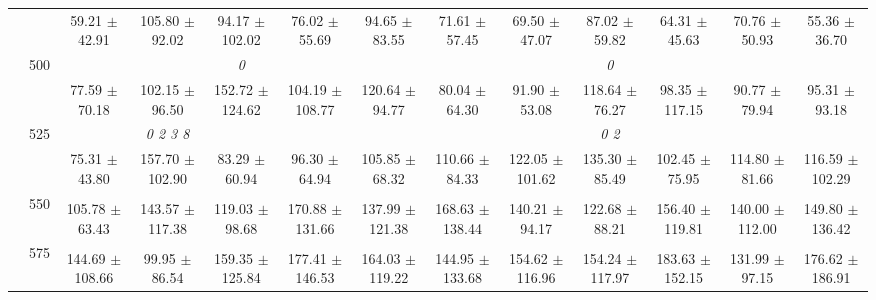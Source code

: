 \begin{table}[h]
{\begin{tabular}{
        ccccccccccccc}
 & & \cellcolor[HTML]{EFEFEF} 59.21 $\pm$ 42.91& \cellcolor[HTML]{EFEFEF} 105.80 $\pm$ 92.02& \cellcolor[HTML]{EFEFEF} 94.17 $\pm$ 102.02& \cellcolor[HTML]{EFEFEF} 76.02 $\pm$ 55.69& \cellcolor[HTML]{EFEFEF} 94.65 $\pm$ 83.55& \cellcolor[HTML]{EFEFEF} 71.61 $\pm$ 57.45& \cellcolor[HTML]{EFEFEF} 69.50 $\pm$ 47.07& \cellcolor[HTML]{EFEFEF} 87.02 $\pm$ 59.82& \cellcolor[HTML]{EFEFEF} 64.31 $\pm$ 45.63& \cellcolor[HTML]{EFEFEF} 70.76 $\pm$ 50.93& \cellcolor[HTML]{EFEFEF} 55.36 $\pm$ 36.70 \\ 
 & \multirow{2}{*}{500}& & & \textit{ 0 }& & & & & \textit{ 0 }& & &  \\ 
 & & 77.59 $\pm$ 70.18& 102.15 $\pm$ 96.50& 152.72 $\pm$ 124.62& 104.19 $\pm$ 108.77& 120.64 $\pm$ 94.77& 80.04 $\pm$ 64.30& 91.90 $\pm$ 53.08& 118.64 $\pm$ 76.27& 98.35 $\pm$ 117.15& 90.77 $\pm$ 79.94& 95.31 $\pm$ 93.18 \\ 
 & \multirow{2}{*}{525}& \cellcolor[HTML]{EFEFEF} & \cellcolor[HTML]{EFEFEF} \textit{ 0 2 3 8 }& \cellcolor[HTML]{EFEFEF} & \cellcolor[HTML]{EFEFEF} & \cellcolor[HTML]{EFEFEF} & \cellcolor[HTML]{EFEFEF} & \cellcolor[HTML]{EFEFEF} & \cellcolor[HTML]{EFEFEF} \textit{ 0 2 }& \cellcolor[HTML]{EFEFEF} & \cellcolor[HTML]{EFEFEF} & \cellcolor[HTML]{EFEFEF}  \\ 
 & & \cellcolor[HTML]{EFEFEF} 75.31 $\pm$ 43.80& \cellcolor[HTML]{EFEFEF} 157.70 $\pm$ 102.90& \cellcolor[HTML]{EFEFEF} 83.29 $\pm$ 60.94& \cellcolor[HTML]{EFEFEF} 96.30 $\pm$ 64.94& \cellcolor[HTML]{EFEFEF} 105.85 $\pm$ 68.32& \cellcolor[HTML]{EFEFEF} 110.66 $\pm$ 84.33& \cellcolor[HTML]{EFEFEF} 122.05 $\pm$ 101.62& \cellcolor[HTML]{EFEFEF} 135.30 $\pm$ 85.49& \cellcolor[HTML]{EFEFEF} 102.45 $\pm$ 75.95& \cellcolor[HTML]{EFEFEF} 114.80 $\pm$ 81.66& \cellcolor[HTML]{EFEFEF} 116.59 $\pm$ 102.29 \\ 
 & \multirow{2}{*}{550}& & & & & & & & & & &  \\ 
 & & 105.78 $\pm$ 63.43& 143.57 $\pm$ 117.38& 119.03 $\pm$ 98.68& 170.88 $\pm$ 131.66& 137.99 $\pm$ 121.38& 168.63 $\pm$ 138.44& 140.21 $\pm$ 94.17& 122.68 $\pm$ 88.21& 156.40 $\pm$ 119.81& 140.00 $\pm$ 112.00& 149.80 $\pm$ 136.42 \\ 
 & \multirow{2}{*}{575}& \cellcolor[HTML]{EFEFEF} & \cellcolor[HTML]{EFEFEF} & \cellcolor[HTML]{EFEFEF} & \cellcolor[HTML]{EFEFEF} & \cellcolor[HTML]{EFEFEF} & \cellcolor[HTML]{EFEFEF} & \cellcolor[HTML]{EFEFEF} & \cellcolor[HTML]{EFEFEF} & \cellcolor[HTML]{EFEFEF} & \cellcolor[HTML]{EFEFEF} & \cellcolor[HTML]{EFEFEF}  \\ 
 & & \cellcolor[HTML]{EFEFEF} 144.69 $\pm$ 108.66& \cellcolor[HTML]{EFEFEF} 99.95 $\pm$ 86.54& \cellcolor[HTML]{EFEFEF} 159.35 $\pm$ 125.84& \cellcolor[HTML]{EFEFEF} 177.41 $\pm$ 146.53& \cellcolor[HTML]{EFEFEF} 164.03 $\pm$ 119.22& \cellcolor[HTML]{EFEFEF} 144.95 $\pm$ 133.68& \cellcolor[HTML]{EFEFEF} 154.62 $\pm$ 116.96& \cellcolor[HTML]{EFEFEF} 154.24 $\pm$ 117.97& \cellcolor[HTML]{EFEFEF} 183.63 $\pm$ 152.15& \cellcolor[HTML]{EFEFEF} 131.99 $\pm$ 97.15& \cellcolor[HTML]{EFEFEF} 176.62 $\pm$ 186.91 \\ 

\end{tabular}}
\end{table}
